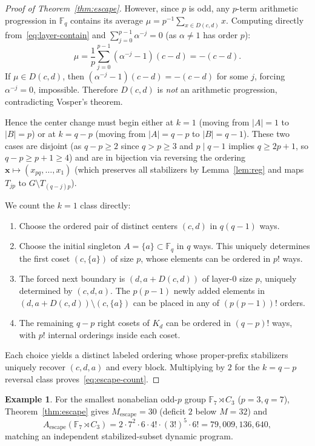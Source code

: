 \documentclass[11pt,reqno]{amsart}
\numberwithin{equation}{section}
\theoremstyle{definition}
\newtheorem{example}[theorem]{Example}
\theoremstyle{remark}
\newcommand{\F}{\mathbb{F}}
\newcommand{\Mesc}{M_{\mathrm{escape}}}
\begin{document}
\begin{proof}[Proof of Theorem~\ref{thm:escape}]
However, since $p$ is odd, any $p$-term arithmetic progression in $\F_q$ contains its average $\mu = p^{-1}\sum_{x\in D(c,d)} x$. Computing directly from~\eqref{eq:layer-contain} and $\sum_{j=0}^{p-1}\alpha^{-j}=0$ (as $\alpha\neq 1$ has order $p$):
\[
\mu = \frac{1}{p}\sum_{j=0}^{p-1}(\alpha^{-j}-1)(c-d) = -(c-d).
\]
If $\mu\in D(c,d)$, then $(\alpha^{-j}-1)(c-d) = -(c-d)$ for some $j$, forcing $\alpha^{-j}=0$, impossible. Therefore $D(c,d)$ is \emph{not} an arithmetic progression, contradicting Vosper's theorem.

Hence the center change must begin either at $k=1$ (moving from $|A|=1$ to $|B|=p$) or at $k=q-p$ (moving from $|A|=q-p$ to $|B|=q-1$). These two cases are disjoint (as $q-p\ge 2$ since $q>p\ge 3$ and $p\mid q-1$ implies $q\ge 2p+1$, so $q-p\ge p+1\ge 4$) and are in bijection via reversing the ordering $\mathbf{x}\mapsto (x_{pq},\ldots,x_1)$ (which preserves all stabilizers by Lemma~\ref{lem:reg} and maps $T_{jp}$ to $G\setminus T_{(q-j)p}$).

We count the $k=1$ class directly:
\begin{enumerate}[label=(\arabic*),leftmargin=2em]
\item Choose the ordered pair of distinct centers $(c,d)$ in $q(q-1)$ ways.
\item Choose the initial singleton $A=\{a\}\subset\F_q$ in $q$ ways. This uniquely determines the first coset $(c,\{a\})$ of size $p$, whose elements can be ordered in $p!$ ways.
\item The forced next boundary is $(d,a+D(c,d))$ of layer-$0$ size $p$, uniquely determined by $(c,d,a)$. The $p(p-1)$ newly added elements in $(d,a+D(c,d))\setminus(c,\{a\})$ can be placed in any of $(p(p-1))!$ orders.
\item The remaining $q-p$ right cosets of $K_d$ can be ordered in $(q-p)!$ ways, with $p!$ internal orderings inside each coset.
\end{enumerate}
Each choice yields a distinct labeled ordering whose proper-prefix stabilizers uniquely recover $(c,d,a)$ and every block. Multiplying by $2$ for the $k=q-p$ reversal class proves~\eqref{eq:escape-count}.
\end{proof}

\begin{example}
\label{ex:f7c3}
For the smallest nonabelian odd-$p$ group $\F_7\rtimes C_3$ ($p=3,q=7$), Theorem~\ref{thm:escape} gives $\Mesc = 30$ (deficit $2$ below $M=32$) and
\[
A_{\mathrm{escape}}(\F_7\rtimes C_3) = 2\cdot 7^2\cdot 6\cdot 4!\cdot (3!)^5\cdot 6! = 79{,}009{,}136{,}640,
\]
matching an independent stabilized-subset dynamic program.
\end{example}
\end{document}
